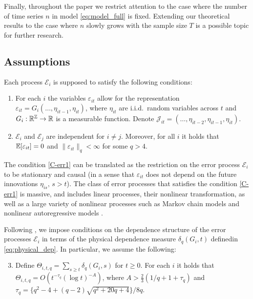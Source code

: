 \documentclass[a4paper,12pt]{article}
\begin{document}
Finally, throughout the paper we restrict attention to the case where the number of time series $n$ in model \eqref{eq:model_full} is fixed. Extending our theoretical results to the case where $n$ slowly grows with the sample size $T$ is a possible topic for further research.

\subsection{Assumptions}\label{subsec:model_assumptions}

Each process $\mathcal{E}_i$ is supposed to satisfy the following conditions: 

\begin{enumerate}[label=(C\arabic*),leftmargin=1.05cm]

\item \label{C-err1} For each $i$ the variables $\varepsilon_{it}$ allow for the representation $\varepsilon_{it} = G_i(\ldots,\eta_{it-1},\eta_{it})$, where $\eta_{it}$ are i.i.d.\ random variables across $t$ and $G_i: \mathbb{R}^{\mathbb{Z}} \rightarrow \mathbb{R}$ is a measurable function. Denote $\mathcal{J}_{it} = (\ldots,\eta_{it-2},\eta_{it-1},\eta_{it})$.

\item \label{C-err2} $\mathcal{E}_i$ and $\mathcal{E}_j$ are independent for $i\neq j$. Moreover, for all $i$ it holds that $\mathbb{E}[\varepsilon_{it}] =0$ and $\| \varepsilon_{it} \|_q < \infty$ for some $q > 4$.
\end{enumerate}
The condition \ref{C-err1} can be translated as the restriction on the error process $\mathcal{E}_i$ to be stationary and causal (in a sense that $\varepsilon_{it}$ does not depend on the future innovations $\eta_{is},\, s >t$). The class of error processes that satisfies the condition \ref{C-err1} is massive, and includes linear processes, their nonlinear transformation, as well as a large variety of nonlinear processes such as Markov chain models and nonlinear autoregressive models \citep[][]{Wu2016}.

Following \cite{Wu2005}, we impose conditions on the dependence structure of the error processes $\mathcal{E}_i$ in terms of the physical dependence measure $\delta_q(G_i, t)$ definedin \eqref{eq:physical_dep}. In particular, we assume the following: 
\begin{enumerate}[label=(C\arabic*),leftmargin=1.05cm]
\setcounter{enumi}{2}

\item \label{C-err3} Define $\Theta_{i, t,q} = \sum\nolimits_{s \ge t} \delta_q(G_i, s)$ for $t \ge 0$. For each $i$ it holds that \linebreak
$\Theta_{i, t,q} = O ( t^{-\tau_q} (\log t)^{-A} )$,  
where $A > \frac{2}{3} (1/q + 1 + \tau_q)$ and \linebreak $\tau_q = \{q^2 - 4 + (q-2) \sqrt{q^2 + 20q + 4}\} / 8q$. 

\end{enumerate}
\end{document}
